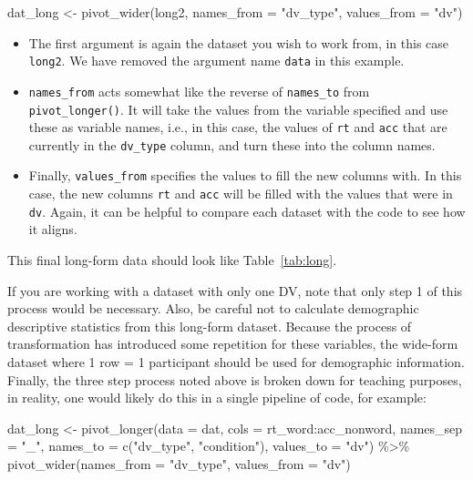 \documentclass[
  english,
  doc,floatsintext]{apa6}
\newenvironment{Shaded}{\begin{snugshade}}{\end{snugshade}}
\newcommand{\AttributeTok}[1]{\textcolor[rgb]{0.77,0.63,0.00}{#1}}
\newcommand{\FunctionTok}[1]{\textcolor[rgb]{0.00,0.00,0.00}{#1}}
\newcommand{\NormalTok}[1]{#1}
\newcommand{\OtherTok}[1]{\textcolor[rgb]{0.56,0.35,0.01}{#1}}
\newcommand{\SpecialCharTok}[1]{\textcolor[rgb]{0.00,0.00,0.00}{#1}}
\newcommand{\StringTok}[1]{\textcolor[rgb]{0.31,0.60,0.02}{#1}}
\begin{document}
\begin{Shaded}
\begin{Highlighting}[]
\NormalTok{dat\_long }\OtherTok{\textless{}{-}} \FunctionTok{pivot\_wider}\NormalTok{(long2, }
                        \AttributeTok{names\_from =} \StringTok{"dv\_type"}\NormalTok{, }
                        \AttributeTok{values\_from =} \StringTok{"dv"}\NormalTok{)}
\end{Highlighting}
\end{Shaded}

\begin{itemize}
\item
  The first argument is again the dataset you wish to work from, in this case \texttt{long2}. We have removed the argument name \texttt{data} in this example.
\item
  \texttt{names\_from} acts somewhat like the reverse of \texttt{names\_to} from \texttt{pivot\_longer()}. It will take the values from the variable specified and use these as variable names, i.e., in this case, the values of \texttt{rt} and \texttt{acc} that are currently in the \texttt{dv\_type} column, and turn these into the column names.
\item
  Finally, \texttt{values\_from} specifies the values to fill the new columns with. In this case, the new columns \texttt{rt} and \texttt{acc} will be filled with the values that were in \texttt{dv}. Again, it can be helpful to compare each dataset with the code to see how it aligns.
\end{itemize}

This final long-form data should look like Table~\ref{tab:long}.

If you are working with a dataset with only one DV, note that only step 1 of this process would be necessary. Also, be careful not to calculate demographic descriptive statistics from this long-form dataset. Because the process of transformation has introduced some repetition for these variables, the wide-form dataset where 1 row = 1 participant should be used for demographic information. Finally, the three step process noted above is broken down for teaching purposes, in reality, one would likely do this in a single pipeline of code, for example:

\begin{Shaded}
\begin{Highlighting}[]
\NormalTok{dat\_long }\OtherTok{\textless{}{-}} \FunctionTok{pivot\_longer}\NormalTok{(}\AttributeTok{data =}\NormalTok{ dat, }
                     \AttributeTok{cols =}\NormalTok{ rt\_word}\SpecialCharTok{:}\NormalTok{acc\_nonword, }
                     \AttributeTok{names\_sep =} \StringTok{"\_"}\NormalTok{, }
                     \AttributeTok{names\_to =} \FunctionTok{c}\NormalTok{(}\StringTok{"dv\_type"}\NormalTok{, }\StringTok{"condition"}\NormalTok{),}
                     \AttributeTok{values\_to =} \StringTok{"dv"}\NormalTok{) }\SpecialCharTok{\%\textgreater{}\%}
  \FunctionTok{pivot\_wider}\NormalTok{(}\AttributeTok{names\_from =} \StringTok{"dv\_type"}\NormalTok{, }
              \AttributeTok{values\_from =} \StringTok{"dv"}\NormalTok{)}
\end{Highlighting}
\end{Shaded}
\end{document}
